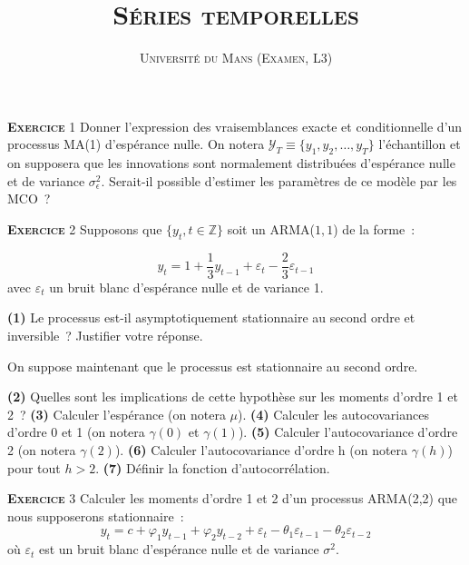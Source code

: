 \documentclass[10pt,a4paper,notitlepage,twocolumn]{article}
\newcommand{\exercice}[1]{\textsc{\textbf{Exercice}} #1}
\newcommand{\question}[1]{\textbf{(#1)}}
\begin{document}
\title{\textsc{Séries temporelles}}
\author{\textsc{Université du Mans (Examen, L3)}}
\date{}


\maketitle


\exercice{1} Donner l'expression des vraisemblances exacte et
conditionnelle d'un processus MA(1) d'espérance nulle. On notera
$\mathcal Y_T \equiv \{y_1,y_2,\dots,y_T\}$ l'échantillon et on
supposera que les innovations sont normalement distribuées d'espérance
nulle et de variance $\sigma_{\epsilon}^2$. Serait-il possible
d'estimer les paramètres de ce modèle par les MCO~?

\bigskip
\bigskip

\exercice{2} Supposons que $\{y_t,t\in\mathbb Z\}$ soit un ARMA($1,1$) de la forme :

\[
y_t = 1 + \frac{1}{3}y_{t-1} + \varepsilon_t - \frac{2}{3} \varepsilon_{t-1}
\]
avec $\varepsilon_t$ un bruit blanc d'espérance nulle et de variance 1.\newline

\question{1}   Le    processus   est-il   asymptotiquement
stationnaire  au   second  ordre   et  inversible~?   Justifier  votre
réponse.\newline

On suppose maintenant que le processus est stationnaire au second
ordre.\newline

\question{2} Quelles sont les implications de cette hypothèse sur les
moments d'ordre 1 et 2~? \question{3} Calculer l'espérance (on notera
$\mu$). \question{4} Calculer les autocovariances d'ordre
0 et 1 (on notera $\gamma(0)$ et $\gamma(1)$). \question{5} Calculer
l'autocovariance d'ordre 2 (on notera $\gamma(2)$). \question{6}
Calculer l'autocovariance d'ordre h (on notera $\gamma(h)$) pour tout
$h>2$.  \question{7} Définir la fonction d'autocorrélation.

\bigskip
\bigskip

\exercice{3} Calculer les moments d'ordre 1 et 2 d'un processus ARMA(2,2) que nous supposerons stationnaire~:
\[
y_t = c + \varphi_1 y_{t-1} + \varphi_2 y_{t-2} + \varepsilon_t - \theta_1 \varepsilon_{t-1} - \theta_2 \varepsilon_{t-2}
\]
où $\varepsilon_t$ est un bruit blanc d'espérance nulle et de variance $\sigma^2$.
\end{document}
